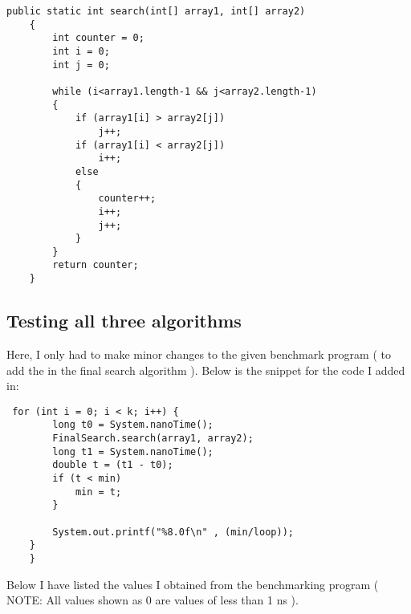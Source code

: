 \documentclass[a4paper,11pt]{article}
\begin{document}
\begin{verbatim}
public static int search(int[] array1, int[] array2) 
    {
        int counter = 0;
        int i = 0;
        int j = 0;

        while (i<array1.length-1 && j<array2.length-1)
        {
            if (array1[i] > array2[j])
                j++;
            if (array1[i] < array2[j])
                i++;
            else
            {
                counter++; 
                i++; 
                j++;
            }
        }
        return counter;
    } 
\end{verbatim} 

\subsection*{Testing all three algorithms }
Here, I only had to make minor changes to the given benchmark program ( to add the in the final search algorithm ). Below is the snippet for the code I added in:

\begin{verbatim}
 for (int i = 0; i < k; i++) {
		long t0 = System.nanoTime();
		FinalSearch.search(array1, array2);
		long t1 = System.nanoTime();
		double t = (t1 - t0);
		if (t < min)
		    min = t;
	    }

	    System.out.printf("%8.0f\n" , (min/loop));
	}
    }
\end{verbatim}

Below I have listed the values I obtained from the benchmarking program ( NOTE: All values shown as 0 are values of less than 1 ns ).
\end{document}
